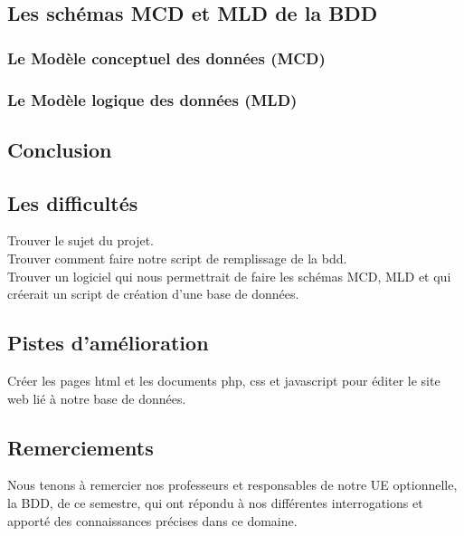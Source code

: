 \documentclass[a4paper, 12pt]{report}
\begin{document}
\begin{spacing}{1.2}
\textcolor{colortitre2}{\subsection*{Les schémas MCD et MLD de la BDD}} 

\textcolor{colortitre3}{\subsubsection*{Le Modèle conceptuel des données (MCD)}}


\textcolor{colortitre3}{\subsubsection*{Le Modèle logique des données (MLD)}}


\newpage
\textcolor{colortitre1}{\section*{Conclusion}} 

\textcolor{colortitre2}{\subsection*{Les difficultés}} 
Trouver le sujet du projet. \\
Trouver comment faire notre script de remplissage de la bdd. \\
Trouver un logiciel qui nous permettrait de faire les schémas MCD, MLD et qui créerait un script de création d'une base de données. \\

\textcolor{colortitre2}{\subsection*{Pistes d'amélioration}} 
Créer les pages html et les documents php, css et javascript pour éditer le site web lié à notre base de données. \\

\textcolor{colortitre2}{\subsection*{Remerciements}} 
Nous tenons à remercier nos professeurs et responsables de notre UE optionnelle, la BDD, de ce semestre, qui ont répondu à nos différentes interrogations et apporté des connaissances précises dans ce domaine.


\end{spacing}
\end{document}
